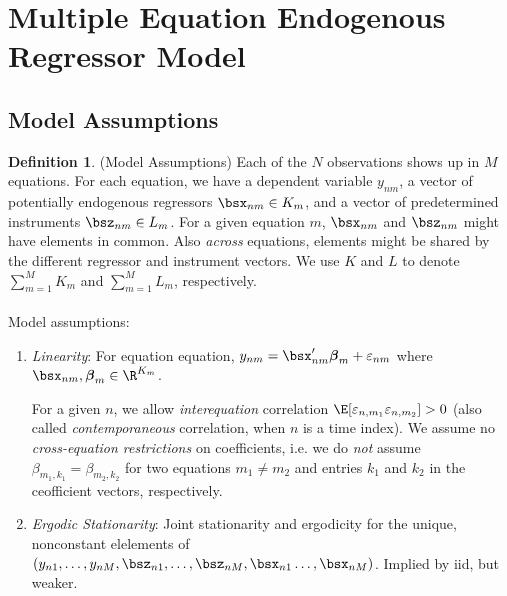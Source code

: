 \documentclass[12pt]{article}
\theoremstyle{plain}
\theoremstyle{definition}
\newtheorem{defn}[thm]{Definition}
\theoremstyle{remark}
\newcommand{\bsbeta}{\boldsymbol{\beta}}
\begin{document}
\clearpage
\section{Multiple Equation Endogenous Regressor Model}

\subsection{Model Assumptions}

\begin{defn}(Model Assumptions)
Each of the $N$ observations shows up in $M$ equations.
For each equation, we have a dependent variable $y_{nm}$, a vector of
potentially endogenous regressors $\bsx_{nm}\in K_m$, and a vector of
predetermined instruments $\bsz_{nm}\in L_m$.
For a given equation $m$, $\bsx_{nm}$
and $\bsz_{nm}$ might have elements in common. Also
\emph{across} equations, elements might be shared by the different
regressor and instrument vectors. We use $K$ and $L$ to denote
$\sum_{m=1}^M K_m$ and $\sum_{m=1}^M L_m$, respectively.
\\
\\
Model assumptions:
\begin{enumerate}
  \item \emph{Linearity}:
    For equation equation,
    $y_{nm} = \bsx_{nm}' \bsbeta_m + \varepsilon_{nm}$
    where $\bsx_{nm},\bsbeta_m\in\R^{K_m}$.

    For a given $n$, we allow \emph{interequation} correlation
    $\E[\varepsilon_{n,m_1}\varepsilon_{n,m_2}]>0$ (also called
    \emph{contemporaneous} correlation, when $n$ is a time index).
    We assume no \emph{cross-equation restrictions} on coefficients,
    i.e. we do \emph{not} assume $\beta_{m_1,k_1} = \beta_{m_2,k_2}$ for
    two equations $m_1\neq m_2$ and entries $k_1$ and $k_2$ in the
    ceofficient vectors, respectively.

  \item \emph{Ergodic Stationarity}:
    Joint stationarity and ergodicity for the unique, nonconstant
    elelements of
    $(y_{n1},\ldots,y_{nM},\bsz_{n1},\ldots,\bsz_{nM},\bsx_{n1}\ldots,\bsx_{nM})$.
    Implied by iid, but weaker.


\end{enumerate}
\end{defn}
\end{document}

